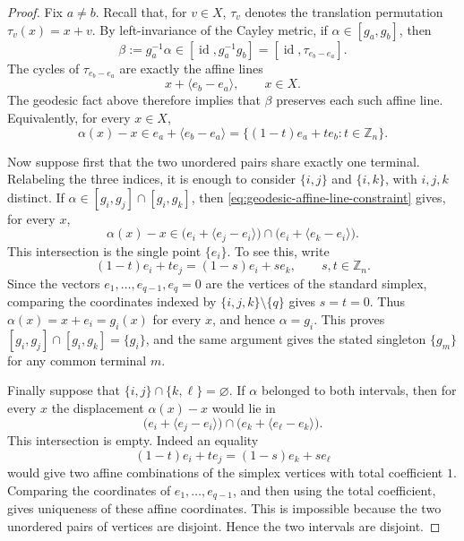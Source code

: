 \documentclass[10pt,a4paper]{amsart}
\DeclareMathOperator{\id}{id}
\begin{document}
\begin{proof}
  Fix $a\ne b$.  Recall that, for $v\in X$, $\tau_v$ denotes the
  translation permutation $\tau_v(x)=x+v$.  By left-invariance of the
  Cayley metric, if
  $\alpha\in[g_a,g_b]$, then
  \begin{equation}
    \beta:=g_a^{-1}\alpha\in[\id,g_a^{-1}g_b]
    =
    [\id,\tau_{e_b-e_a}].
  \end{equation}
  The cycles of $\tau_{e_b-e_a}$ are exactly the affine lines
  \begin{equation}
    x+\langle e_b-e_a\rangle,\qquad x\in X.
  \end{equation}
  The geodesic fact above therefore implies that $\beta$ preserves each
  such affine line.  Equivalently, for every $x\in X$,
  \begin{equation}
    \label{eq:geodesic-affine-line-constraint}
    \alpha(x)-x
    \in e_a+\langle e_b-e_a\rangle
    =
    \{(1-t)e_a+te_b:t\in\mathbb Z_n\}.
  \end{equation}

  Now suppose first that the two unordered pairs share exactly one
  terminal.  Relabeling the three indices, it is enough to consider
  $\{i,j\}$ and $\{i,k\}$, with $i,j,k$ distinct.  If
  $\alpha\in[g_i,g_j]\cap[g_i,g_k]$, then
  \eqref{eq:geodesic-affine-line-constraint} gives, for every $x$,
  \begin{equation}
    \alpha(x)-x\in
    \bigl(e_i+\langle e_j-e_i\rangle\bigr)
    \cap
    \bigl(e_i+\langle e_k-e_i\rangle\bigr).
  \end{equation}
  This intersection is the single point $\{e_i\}$.  To see this, write
  \begin{equation}
    (1-t)e_i+te_j=(1-s)e_i+se_k,\qquad s,t\in\mathbb Z_n.
  \end{equation}
  Since the vectors $e_1,\ldots,e_{q-1},e_q=0$ are the vertices of the
  standard simplex, comparing the coordinates indexed by
  $\{i,j,k\}\setminus\{q\}$ gives $s=t=0$.  Thus
  $\alpha(x)=x+e_i=g_i(x)$ for every $x$, and hence
  $\alpha=g_i$.  This proves
  $[g_i,g_j]\cap[g_i,g_k]=\{g_i\}$, and the same argument gives the
  stated singleton $\{g_m\}$ for any common terminal $m$.

  Finally suppose that $\{i,j\}\cap\{k,\ell\}=\varnothing$.  If
  $\alpha$ belonged to both intervals, then for every $x$ the
  displacement $\alpha(x)-x$ would lie in
  \begin{equation}
    \bigl(e_i+\langle e_j-e_i\rangle\bigr)
    \cap
    \bigl(e_k+\langle e_\ell-e_k\rangle\bigr).
  \end{equation}
  This intersection is empty.  Indeed an equality
  \begin{equation}
    (1-t)e_i+te_j=(1-s)e_k+se_\ell
  \end{equation}
  would give two affine combinations of the simplex vertices with total
  coefficient $1$.  Comparing the coordinates of
  $e_1,\ldots,e_{q-1}$, and then using the total coefficient, gives
  uniqueness of these affine coordinates.  This is impossible because
  the two unordered pairs of vertices are disjoint.  Hence the two
  intervals are disjoint.
\end{proof}
\end{document}

